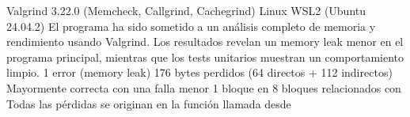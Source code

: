 \markdownRendererDocumentBegin
\markdownRendererSectionBegin
{}\markdownRendererInterblockSeparator
{} Valgrind 3.22.0 (Memcheck, Callgrind, Cachegrind) \markdownRendererInterblockSeparator
{} Linux WSL2 (Ubuntu 24.04.2)\markdownRendererInterblockSeparator
{}El programa ha sido sometido a un análisis completo de memoria y rendimiento usando Valgrind. Los resultados revelan un memory leak menor en el programa principal, mientras que los tests unitarios muestran un comportamiento limpio.\markdownRendererInterblockSeparator
{}\markdownRendererSectionBegin
{}\markdownRendererInterblockSeparator
{}\markdownRendererSectionBegin
{}\markdownRendererInterblockSeparator
{}\markdownRendererUlBeginTight
\markdownRendererUlItem {} 1 error (memory leak)\markdownRendererUlItemEnd 
\markdownRendererUlItem {} 176 bytes perdidos (64 directos + 112 indirectos)\markdownRendererUlItemEnd 
\markdownRendererUlItem {} Mayormente correcta con una falla menor\markdownRendererUlItemEnd 
\markdownRendererUlEndTight \markdownRendererInterblockSeparator
{}
\markdownRendererSectionEnd \markdownRendererSectionBegin
{}\markdownRendererInterblockSeparator
{}\markdownRendererInterblockSeparator
{}
\markdownRendererSectionEnd \markdownRendererSectionBegin
{}\markdownRendererInterblockSeparator
{}\markdownRendererUlBeginTight
\markdownRendererUlItem {} 1 bloque en \markdownRendererUlItemEnd 
\markdownRendererUlItem {} 8 bloques relacionados con \markdownRendererUlItemEnd 
\markdownRendererUlItem {} Todas las pérdidas se originan en la función  llamada desde \markdownRendererUlItemEnd 
\markdownRendererUlEndTight \markdownRendererInterblockSeparator
